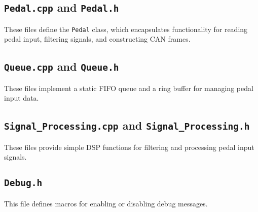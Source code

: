 \documentclass[a4paper,12pt]{article}
\begin{document}


\subsection{\texttt{Pedal.cpp} and \texttt{Pedal.h}}
These files define the \texttt{Pedal} class, which encapsulates functionality for reading pedal input, filtering signals, and constructing CAN frames.





\subsection{\texttt{Queue.cpp} and \texttt{Queue.h}}
These files implement a static FIFO queue and a ring buffer for managing pedal input data.





\subsection{\texttt{Signal\_Processing.cpp} and \texttt{Signal\_Processing.h}}
These files provide simple DSP functions for filtering and processing pedal input signals.





\subsection{\texttt{Debug.h}}
This file defines macros for enabling or disabling debug messages.
\end{document}
